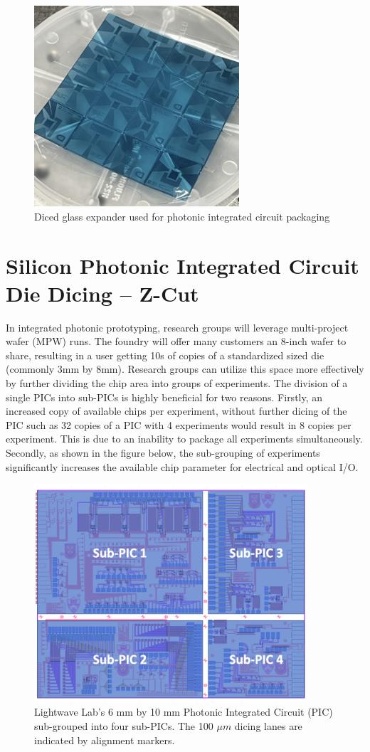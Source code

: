 \begin{figure}[!ht]
\centering
\includegraphics[width=3in]{./Figures/AppendixA/FigAppA03}
\caption{Diced glass expander used for photonic integrated circuit packaging}
\label{FigAppA3}
\end{figure}

\section{Silicon Photonic Integrated Circuit Die Dicing – Z-Cut}

\qquad In integrated photonic prototyping, research groups will leverage multi-project wafer (MPW) runs. The foundry will offer many customers an 8-inch wafer to share, resulting in a user getting 10s of copies of a standardized sized die (commonly 3mm by 8mm). Research groups can utilize this space more effectively by further dividing the chip area into groups of experiments. The division of a single PICs into sub-PICs is highly beneficial for two reasons. Firstly, an increased copy of available chips per experiment, without further dicing of the PIC such as 32 copies of a PIC with 4 experiments would result in 8 copies per experiment. This is due to an inability to package all experiments simultaneously. Secondly, as shown in the figure below, the sub-grouping of experiments significantly increases the available chip parameter for electrical and optical I/O. 

\begin{figure}[!ht]
\centering
\includegraphics[width=4in]{./Figures/AppendixA/FigAppA04}
\caption{Lightwave Lab’s 6 mm by 10 mm Photonic Integrated Circuit (PIC) sub-grouped into four sub-PICs. The 100 $\mu m$ dicing lanes are indicated by alignment markers.}
\label{FigAppA4}
\end{figure}

